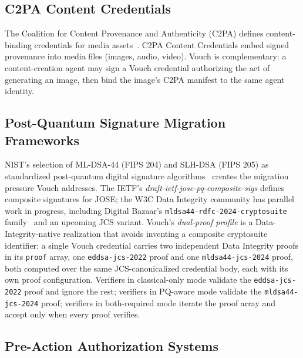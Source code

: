 \documentclass[11pt,a4paper]{article}
\begin{document}
\subsection{C2PA Content Credentials}

The Coalition for Content Provenance and Authenticity (C2PA) defines content-binding credentials for media assets~\cite{c2pa14}. C2PA Content Credentials embed signed provenance into media files (images, audio, video). Vouch is complementary: a content-creation agent may sign a Vouch credential authorizing the act of generating an image, then bind the image's C2PA manifest to the same agent identity.

\subsection{Post-Quantum Signature Migration Frameworks}

NIST's selection of ML-DSA-44 (FIPS 204) and SLH-DSA (FIPS 205) as standardized post-quantum digital signature algorithms~\cite{nistfips204} creates the migration pressure Vouch addresses. The IETF's \emph{draft-ietf-jose-pq-composite-sigs} defines composite signatures for JOSE; the W3C Data Integrity community has parallel work in progress, including Digital Bazaar's \texttt{mldsa44-rdfc-2024-cryptosuite} family~\cite{db-mldsa44} and an upcoming JCS variant. Vouch's \emph{dual-proof profile} is a Data-Integrity-native realization that avoids inventing a composite cryptosuite identifier: a single Vouch credential carries two independent Data Integrity proofs in its \verb|proof| array, one \texttt{eddsa-jcs-2022} proof and one \texttt{mldsa44-jcs-2024} proof, both computed over the same JCS-canonicalized credential body, each with its own proof configuration. Verifiers in classical-only mode validate the \texttt{eddsa-jcs-2022} proof and ignore the rest; verifiers in PQ-aware mode validate the \texttt{mldsa44-jcs-2024} proof; verifiers in both-required mode iterate the proof array and accept only when every proof verifies.

\subsection{Pre-Action Authorization Systems}
\label{sec:related-preaction}
\end{document}
